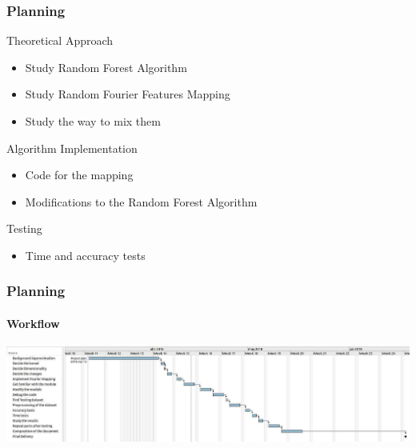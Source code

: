 \documentclass{beamer}
\begin{document}
\begin{frame}
\frametitle{Planning}

\begin{block}{Theoretical Approach}
\begin{itemize}
    \item Study Random Forest Algorithm
    \item Study Random Fourier Features Mapping
    \item Study the way to mix them
\end{itemize}
\end{block}

\begin{block}{Algorithm Implementation}
\begin{itemize}
    \item Code for the mapping
    \item Modifications to the Random Forest Algorithm
\end{itemize}
\end{block}

\begin{block}{Testing}
\begin{itemize}
    \item Time and accuracy tests
\end{itemize}
\end{block}

\end{frame}

\begin{frame}
\frametitle{Planning}
\framesubtitle{Workflow}
\includegraphics[width=\textwidth]{gantt2}
\end{frame}


\end{document}
